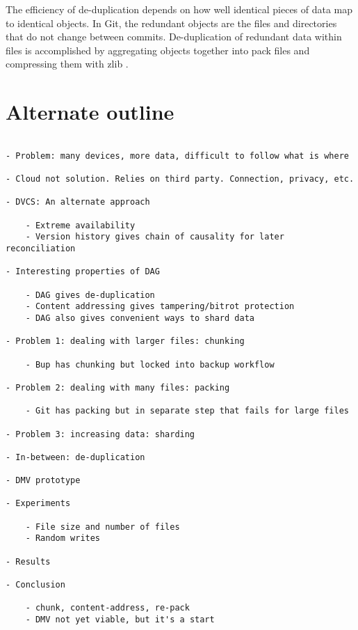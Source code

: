 The efficiency of de-duplication depends on how well identical pieces of data map to identical objects.
In Git, the redundant objects are the files and directories that do not change between commits.
De-duplication of redundant data within files is accomplished by aggregating objects together into pack files and compressing them with zlib \cite[Section 10.4]{git_book}.



\section*{Alternate outline}

\begin{verbatim}

- Problem: many devices, more data, difficult to follow what is where

- Cloud not solution. Relies on third party. Connection, privacy, etc.

- DVCS: An alternate approach

    - Extreme availability
    - Version history gives chain of causality for later reconciliation

- Interesting properties of DAG

    - DAG gives de-duplication
    - Content addressing gives tampering/bitrot protection
    - DAG also gives convenient ways to shard data

- Problem 1: dealing with larger files: chunking

    - Bup has chunking but locked into backup workflow

- Problem 2: dealing with many files: packing

    - Git has packing but in separate step that fails for large files

- Problem 3: increasing data: sharding

- In-between: de-duplication

- DMV prototype

- Experiments

    - File size and number of files
    - Random writes

- Results

- Conclusion

    - chunk, content-address, re-pack
    - DMV not yet viable, but it's a start

\end{verbatim}

